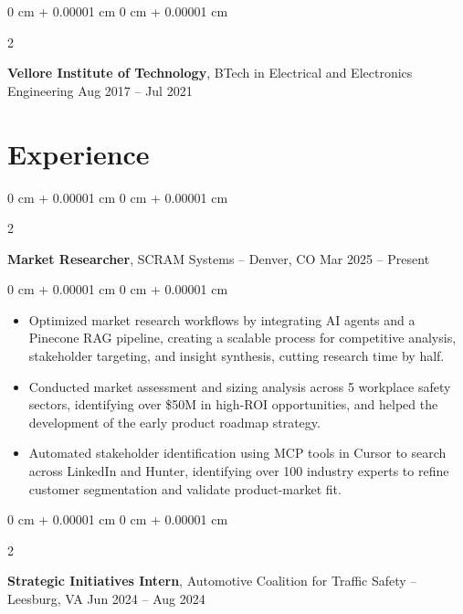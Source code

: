 \documentclass[10pt, letterpaper]{article}
\newenvironment{highlights}{
    \begin{itemize}[
        topsep=0.10 cm,
        parsep=0.10 cm,
        partopsep=0pt,
        itemsep=0pt,
        leftmargin=0 cm + 10pt
    ]
}{
    \end{itemize}
} %
\newenvironment{onecolentry}{
    \begin{adjustwidth}{
        0 cm + 0.00001 cm
    }{
        0 cm + 0.00001 cm
    }
}{
    \end{adjustwidth}
} %
\newenvironment{twocolentry}[2][]{
    \onecolentry
    \def\secondColumn{#2}
    \setcolumnwidth{\fill, 4.5 cm}
    \begin{paracol}{2}
}{
    \switchcolumn \raggedleft \secondColumn
    \end{paracol}
    \endonecolentry
} %
\begin{document}
\vspace{0.15 cm}



        \begin{twocolentry}{
            Aug 2017 – Jul 2021
        }
            \textbf{Vellore Institute of Technology}, BTech in Electrical and Electronics Engineering\end{twocolentry}


    
    \section{Experience}



        
        \begin{twocolentry}{
            Mar 2025 – Present
        }
            \textbf{Market Researcher}, SCRAM Systems -- Denver, CO\end{twocolentry}

        \vspace{0.10 cm}
        \begin{onecolentry}
            \begin{highlights}
                \item Optimized market research workflows by integrating AI agents and a Pinecone RAG pipeline, creating a scalable process for competitive analysis, stakeholder targeting, and insight synthesis, cutting research time by half.

                \item Conducted market assessment and sizing analysis across 5 workplace safety sectors, identifying over \$50M in high-ROI opportunities, and helped the development of the early product roadmap strategy.

                \item Automated stakeholder identification using MCP tools in Cursor to search across LinkedIn and Hunter, identifying over 100 industry experts to refine customer segmentation and validate product-market fit.

            \end{highlights}
        \end{onecolentry}

        \vspace{0.2 cm}
                \begin{twocolentry}{
            Jun 2024 – Aug 2024
        }
            \textbf{Strategic Initiatives Intern}, Automotive Coalition for Traffic Safety -- Leesburg, VA\end{twocolentry}
\end{document}
